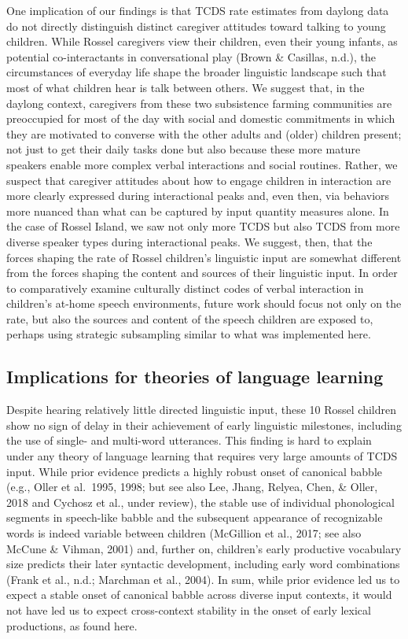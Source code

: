 \documentclass[
  english,
  ,man,floatsintext]{apa6}
\begin{document}
One implication of our findings is that TCDS rate estimates from daylong data do not directly distinguish distinct caregiver attitudes toward talking to young children. While Rossel caregivers view their children, even their young infants, as potential co-interactants in conversational play (Brown \& Casillas, n.d.), the circumstances of everyday life shape the broader linguistic landscape such that most of what children hear is talk between others. We suggest that, in the daylong context, caregivers from these two subsistence farming communities are preoccupied for most of the day with social and domestic commitments in which they are motivated to converse with the other adults and (older) children present; not just to get their daily tasks done but also because these more mature speakers enable more complex verbal interactions and social routines. Rather, we suspect that caregiver attitudes about how to engage children in interaction are more clearly expressed during interactional peaks and, even then, via behaviors more nuanced than what can be captured by input quantity measures alone. In the case of Rossel Island, we saw not only more TCDS but also TCDS from more diverse speaker types during interactional peaks. We suggest, then, that the forces shaping the rate of Rossel children's linguistic input are somewhat different from the forces shaping the content and sources of their linguistic input. In order to comparatively examine culturally distinct codes of verbal interaction in children's at-home speech environments, future work should focus not only on the rate, but also the sources and content of the speech children are exposed to, perhaps using strategic subsampling similar to what was implemented here.

\hypertarget{implications-for-theories-of-language-learning}{%
\subsection{Implications for theories of language learning}\label{implications-for-theories-of-language-learning}}

Despite hearing relatively little directed linguistic input, these 10 Rossel children show no sign of delay in their achievement of early linguistic milestones, including the use of single- and multi-word utterances. This finding is hard to explain under any theory of language learning that requires very large amounts of TCDS input. While prior evidence predicts a highly robust onset of canonical babble (e.g., Oller et al.~1995, 1998; but see also Lee, Jhang, Relyea, Chen, \& Oller, 2018 and Cychosz et al., under review), the stable use of individual phonological segments in speech-like babble and the subsequent appearance of recognizable words is indeed variable between children (McGillion et al., 2017; see also McCune \& Vihman, 2001) and, further on, children's early productive vocabulary size predicts their later syntactic development, including early word combinations (Frank et al., n.d.; Marchman et al., 2004). In sum, while prior evidence led us to expect a stable onset of canonical babble across diverse input contexts, it would not have led us to expect cross-context stability in the onset of early lexical productions, as found here.
\end{document}
